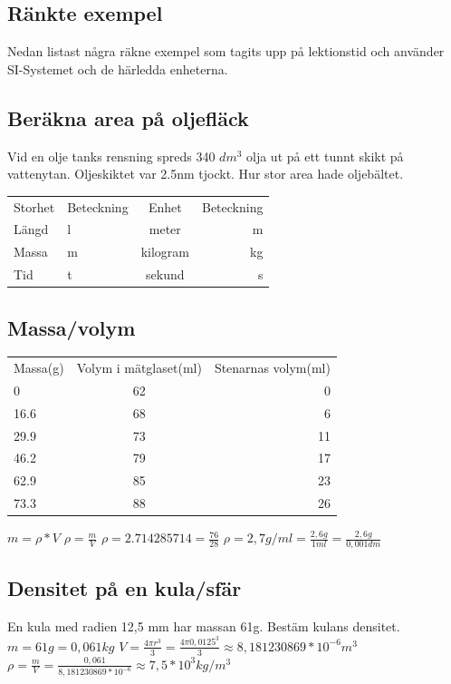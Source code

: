 \documentclass[a4paper,11pt]{article}
\begin{document}
\begin{flushleft}
\section{Ränkte exempel}
Nedan listast några räkne exempel som tagits upp på lektionstid och använder SI-Systemet och de härledda enheterna.

\subsection{Beräkna area på oljefläck} Vid en olje tanks rensning spreds 340 $ dm^3 $ olja ut på ett tunnt skikt på vattenytan.
Oljeskiktet var 2.5nm tjockt.\newline
Hur stor area hade oljebältet.\newline

\begin{tabular}{l l | c r}
  Storhet & Beteckning & Enhet & Beteckning\\
  Längd & l & meter & m\\
  Massa & m & kilogram & kg\\
  Tid & t & sekund & s\\
\end{tabular}

\subsection{Massa/volym}

\begin{tabular}{l c r}
  Massa(g) & Volym i mätglaset(ml) & Stenarnas volym(ml)\\
  0 & 62 & 0\\
  16.6 & 68 & 6\\
  29.9 & 73 & 11\\
  46.2 & 79 & 17\\
  62.9 & 85 & 23\\
  73.3 & 88 & 26\\
\end{tabular}
\newline
\newline
$ m = \rho * V  $
\newline
$ \rho = \frac{m}{V} $
\newline
$ \rho = 2.714285714 = \frac{76}{28} $\newline
$ \rho = 2,7 g/ml = \frac{2,6 g}{1 ml} = \frac{2,6 g}{0,001 dm} $
\newpage

\subsection{Densitet på en kula/sfär}
En kula med radien 12,5 mm har massan 61g.\newline
Bestäm kulans densitet.\newline
$ m = 61g = 0,061 kg $\newline
$ V = \frac{4\pi r^3}{3} = \frac{4\pi 0,0125^3}{3} \approx 8,181230869*10^{-6} m^3 $\newline
$ \rho = \frac{m}{V} = \frac{0,061}{8,181230869*10^{-6}} \approx 7,5*10^3 kg/m^3 $\newline
\newline

\end{flushleft}
\end{document}
